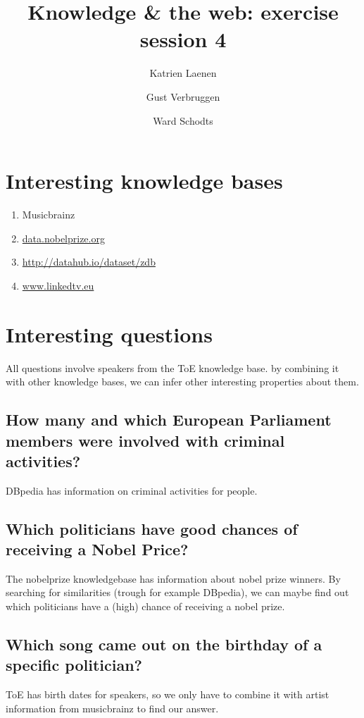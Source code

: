 \documentclass[11pt,a4paper]{article}
\author{
  Katrien Laenen\\
  \and
  Gust Verbruggen\\
  \and
  Ward Schodts
}
\title{Knowledge \& the web: exercise session 4}
\begin{document}
\maketitle
\section{Interesting knowledge bases}
\begin{enumerate}

\item Musicbrainz
\item \url{data.nobelprize.org}
\item \url{http://datahub.io/dataset/zdb}
\item \url{www.linkedtv.eu}

\end{enumerate}

\section{Interesting questions}

All questions involve speakers from the ToE knowledge base. by combining it with other knowledge bases, we can infer other interesting properties about them. 


\subsection{How many and which European Parliament members were involved with criminal activities?}

DBpedia has information on criminal activities for people.

\subsection{Which politicians have good chances of receiving a Nobel Price?}

The nobelprize knowledgebase has information about nobel prize winners. By searching for similarities (trough for example DBpedia), we can maybe find out which politicians have a (high) chance of receiving a nobel prize.

\subsection{Which song came out on the birthday of a specific politician?}

ToE has birth dates for speakers, so we only have to combine it with artist information from musicbrainz to find our answer.
\end{document}
